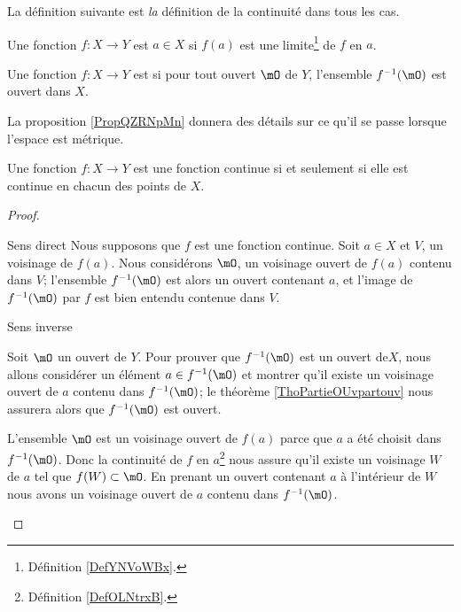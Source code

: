 La définition suivante est \emph{la} définition de la continuité dans tous les cas.
\begin{definition}\label{DefOLNtrxB}
    Une fonction \( f\colon X\to Y\) est  \( a\in X\) si \( f(a)\) est une limite\footnote{Définition \ref{DefYNVoWBx}.} de \( f\) en \( a\).

    Une fonction \( f\colon X\to Y\) est  si pour tout ouvert \( \mO\) de \( Y\), l'ensemble \( f^{-1}(\mO)\) est ouvert dans \( X\).
\end{definition}
La proposition \ref{PropQZRNpMn} donnera des détails sur ce qu'il se passe lorsque l'espace est métrique.

\begin{theorem} \label{ThoESCaraB}
    Une fonction \( f\colon X\to Y\) est une fonction continue si et seulement si elle est continue en chacun des points de \( X\).
\end{theorem}

\begin{proof}
    \begin{subproof}
    \item[Sens direct]
        Nous supposons que \( f\) est une fonction continue. Soit \( a\in X\) et \( V\), un voisinage de \( f(a)\). Nous considérons \( \mO\), un voisinage ouvert de \( f(a)\) contenu dans \( V\); l'ensemble \( f^{-1}(\mO)\) est alors un ouvert contenant \( a\), et l'image de \( f^{-1}(\mO)\) par \( f\) est bien entendu contenue dans \( V\).

    \item[Sens inverse]

        Soit \( \mO\) un ouvert de \( Y\). Pour prouver que \( f^{-1}(\mO)\) est un ouvert de\( X\), nous allons considérer un élément \( a\in f^{-1}(\mO)\) et montrer qu'il existe un voisinage ouvert de \( a\) contenu dans \( f^{-1}(\mO)\); le théorème \ref{ThoPartieOUvpartouv} nous assurera alors que \( f^{-1}(\mO)\) est ouvert.

        L'ensemble \( \mO\) est un voisinage ouvert de \( f(a)\) parce que \( a\) a été choisit dans \( f^{-1}(\mO)\). Donc la continuité de \( f\) en \( a\)\footnote{Définition \ref{DefOLNtrxB}.} nous assure qu'il existe un voisinage \( W\) de \( a\) tel que \( f(W)\subset\mO\). En prenant un ouvert contenant \( a\) à l'intérieur de \( W\) nous avons un voisinage ouvert de \( a\) contenu dans \( f^{-1}(\mO)\).
    \end{subproof}
\end{proof}

